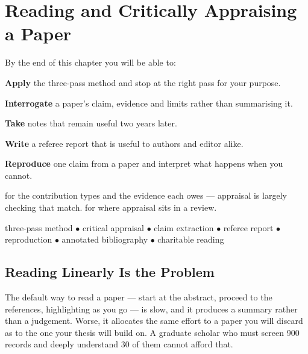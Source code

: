 \chapter{Reading and Critically Appraising a Paper}\label{ch:appraisal}

\begin{outcomes}
By the end of this chapter you will be able to:
\begin{tight}
  \item \textbf{Apply} the three-pass method and stop at the right pass for
    your purpose.
  \item \textbf{Interrogate} a paper's claim, evidence and limits rather than
    summarising it.
  \item \textbf{Take} notes that remain useful two years later.
  \item \textbf{Write} a referee report that is useful to authors and editor
    alike.
  \item \textbf{Reproduce} one claim from a paper and interpret what happens
    when you cannot.
\end{tight}
\end{outcomes}

\begin{prereq}
 for the contribution types and the evidence each owes ---
appraisal is largely checking that match.  for where appraisal sits
in a review.
\end{prereq}

\begin{keyterms}
three-pass method $\bullet$ critical appraisal $\bullet$ claim extraction
$\bullet$ referee report $\bullet$ reproduction $\bullet$ annotated
bibliography $\bullet$ charitable reading
\end{keyterms}

\section{Reading Linearly Is the Problem}

The default way to read a paper --- start at the abstract, proceed to the
references, highlighting as you go --- is slow, and it produces a summary
rather than a judgement. Worse, it allocates the same effort to a paper you
will discard as to the one your thesis will build on. A graduate scholar who
must screen 900 records and deeply understand 30 of them cannot afford that.

